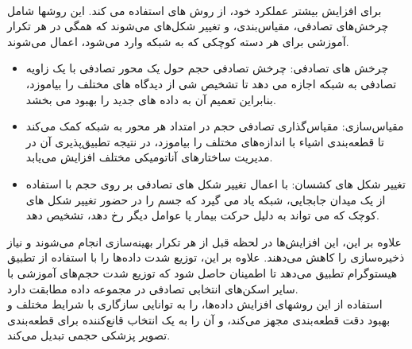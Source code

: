 \\
 برای افزایش بیشتر عملکرد خود، از روش های استفاده می کند. این روشها شامل چرخش‌های تصادفی، مقیاس‌بندی، و تغییر شکل‌های می‌شوند که همگی در هر تکرار آموزشی برای هر دسته کوچکی که به شبکه وارد می‌شود، اعمال می‌شوند.
\begin{itemize}
\item چرخش های تصادفی: چرخش تصادفی حجم حول یک محور تصادفی با یک زاویه تصادفی به شبکه اجازه می دهد تا تشخیص شی از دیدگاه های مختلف را بیاموزد، بنابراین تعمیم آن به داده های جدید را بهبود می بخشد.
\item مقیاس‌سازی: مقیاس‌گذاری تصادفی حجم در امتداد هر محور به شبکه کمک می‌کند تا قطعه‌بندی اشیاء با اندازه‌های مختلف را بیاموزد، در نتیجه تطبیق‌پذیری آن در مدیریت ساختارهای آناتومیکی مختلف افزایش می‌یابد.
\item تغییر شکل های کشسان: با اعمال تغییر شکل های تصادفی بر روی حجم با استفاده از یک میدان جابجایی، شبکه یاد می گیرد که جسم را در حضور تغییر شکل های کوچک که می تواند به دلیل حرکت بیمار یا عوامل دیگر رخ دهد، تشخیص دهد.
\end{itemize}

علاوه بر این، این افزایش‌ها در لحظه قبل از هر تکرار بهینه‌سازی انجام می‌شوند و نیاز ذخیره‌سازی را کاهش می‌دهند. علاوه بر این،  توزیع شدت داده‌ها را با استفاده از تطبیق هیستوگرام تطبیق می‌دهد تا اطمینان حاصل شود که توزیع شدت حجم‌های آموزشی با سایر اسکن‌های انتخابی تصادفی در مجموعه داده مطابقت دارد.
\\
استفاده از این روشهای افزایش داده‌ها،  را به توانایی سازگاری با شرایط مختلف و بهبود دقت قطعه‌بندی مجهز می‌کند، و آن را به یک انتخاب قانع‌کننده برای قطعه‌بندی تصویر پزشکی حجمی تبدیل می‌کند\cite{shamshad2023transformers}.

